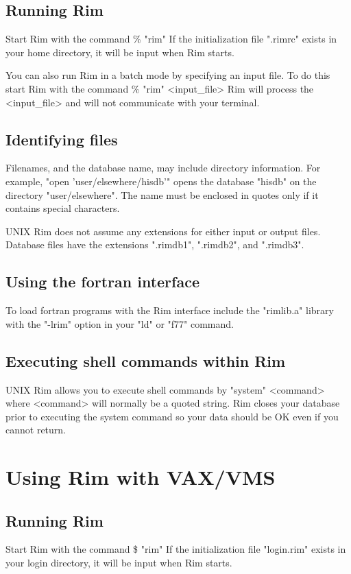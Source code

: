 \subsection{Running Rim}
Start Rim with the command
\<\% "rim" \>
If the initialization file ".rimrc" exists in your home directory, it will
be input when Rim starts.
 
You can also run Rim in a batch mode by specifying an input file.
To do this start Rim with the command
\<\% "rim" <input_file>\>
Rim will process the <input_file> and will not communicate
with your terminal.
 
\subsection{Identifying files}
%
Filenames, and the database name, may include directory information.
For example,
\<"open 'user/elsewhere/hisdb'"\>
opens the database "hisdb" on the directory "user/elsewhere".
The name must be enclosed in quotes only if it
contains special characters.
 
UNIX Rim does not assume any extensions for either input or
output files.
Database files have the extensions ".rimdb1", ".rimdb2", and ".rimdb3".
 
 
\subsection{Using the fortran interface}
%
To load fortran programs with the Rim interface include the
"rimlib.a" library with the "-lrim" option
in your "ld" or "f77" command.
 
 
\subsection{Executing shell commands within Rim}
%
UNIX Rim allows you to execute shell
commands by
\<"system" <command>\>
where <command> will normally be a quoted string.
Rim closes your database prior to executing
the system command so your data should be OK even if you
cannot return.
 
 
\section{Using Rim with VAX/VMS}
%
 
\subsection{Running Rim}
Start Rim with the command
\<\$ "rim" \>
If the initialization file "login.rim" exists in your login directory, it will
be input when Rim starts.
 
